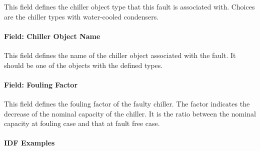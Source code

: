 This field defines the chiller object type that this fault is associated with. Choices are the chiller types with water-cooled condensers.

\paragraph{Field: Chiller Object Name}\label{field-chiller-object-name}

This field defines the name of the chiller object associated with the fault. It should be one of the objects with the defined types.

\paragraph{Field: Fouling Factor}

This field defines the fouling factor of the faulty chiller. The factor indicates the decrease of the nominal capacity of the chiller. It is the ratio between the nominal capacity at fouling case and that at fault free case.

\paragraph{IDF Examples}

